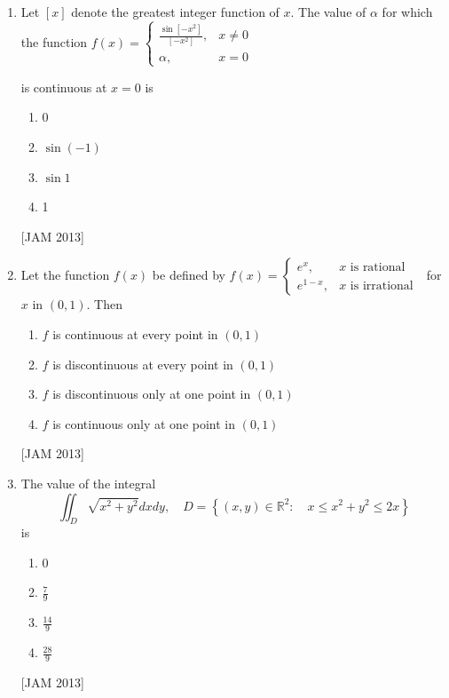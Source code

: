 \begin{enumerate}
\item  Let $[x]$ denote the greatest integer function of $x$. The value of $\alpha$ for which the function $f(x)= \begin{cases}\frac{\sin \left[-x^{2}\right]}{\left[-x^{2}\right]}, & x \neq 0 \\ \alpha, & x=0\end{cases}$

is continuous at $x=0$ is 


\begin{enumerate}
    
\item 0 
\item $\sin (-1)$ 
\item $\sin 1$ 
\item 1
\end{enumerate}
\hfill [JAM 2013]



\item  Let the function $f(x)$ be defined by $f(x)= \begin{cases}e^{x}, & x \text { is rational } \\ e^{1-x}, & x \text { is irrational }\end{cases}$ for $x$ in $(0,1)$. Then 


\begin{enumerate}
    
\item $f$ is continuous at every point in $(0,1)$ 
\item $f$ is discontinuous at every point in $(0,1)$ 
\item $f$ is discontinuous only at one point in $(0,1)$ 
\item $f$ is continuous only at one point in $(0,1)$
\end{enumerate}
\hfill [JAM 2013]



\item  The value of the integral
$$
\iint_{D} \sqrt{x^{2}+y^{2}} d x d y, \quad D=\left\{(x, y) \in \mathbb{R}^{2}: \quad x \leq x^{2}+y^{2} \leq 2 x\right\}
$$
is 


\begin{enumerate}
   
\item 0 
\item $\frac{7}{9}$ 
\item $\frac{14}{9}$ 
\item $\frac{28}{9}$ 
\end{enumerate}
\hfill [JAM 2013]




\end{enumerate}
